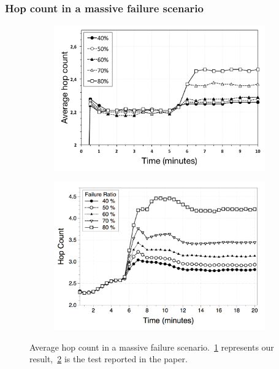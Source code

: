 \documentclass{beamer}
\begin{document}
\begin{frame}
\frametitle{Hop count in a massive failure scenario}

\begin{figure}
\centering
\begin{subfigure}{.5\textwidth}
  \centering
  \includegraphics[keepaspectratio=true, width=1\linewidth]{images/average_hop_count_failures_1impl}
  \caption{}
  \label{fig:average_hop_count_failures_1impl}
\end{subfigure}%
\begin{subfigure}{.5\textwidth}
  \centering
  \includegraphics[keepaspectratio=true, width=1\linewidth]{images/paper_average_hop_count_failures}
  \caption{}
  \label{fig:paper_average_hop_count_failures}
\end{subfigure}
\caption{Average hop count in a massive failure scenario.~\ref{fig:average_hop_count_failures_1impl} represents our result,~\ref{fig:paper_average_hop_count_failures} is the test reported in the paper.}
\label{fig:robustness_hop_count_failures}
\end{figure}

\end{frame}
\end{document}
